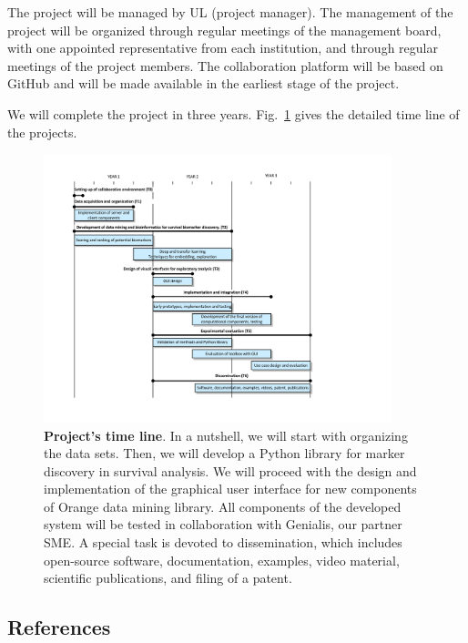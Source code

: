 \documentclass[11pt,a4paper]{article}
\renewcommand{\bold}{\textbf}
\begin{document}
The project will be managed by UL (project manager). The management of the project will be organized through regular meetings of the management board, with one appointed representative from each institution, and through regular meetings of the project members. The collaboration platform will be based on GitHub and will be made available in the earliest stage of the project.

We will complete the project in three years. Fig.~\ref{fig:gantt} gives the detailed time line of the projects.

\begin{figure}
\includegraphics[width=0.90\textwidth]{gantt}
\caption{\small\bold{Project's time line}. In a nutshell, we will start with organizing the data sets. Then, we will develop a Python library for marker discovery in survival analysis. We will proceed with the design and implementation of the graphical user interface for new components of Orange data mining library. All components of the developed system will be tested in collaboration with Genialis, our partner SME. A special task is devoted to dissemination, which includes open-source software, documentation, examples, video material, scientific publications, and filing of a patent.}
\label{fig:gantt}
\end{figure}

\subsection*{References}


\begin{multicols}{2}
\footnotesize
\setlength{\parskip}{0em}
\renewcommand{\baselinestretch}{1.0}


\end{multicols}
\end{document}
